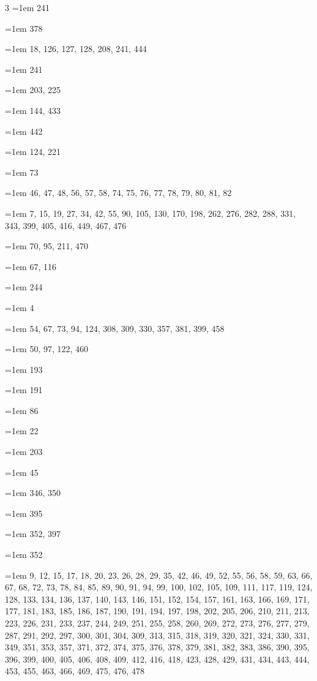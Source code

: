 \begin{multicols}{3}
\hangindent=1em  241\par
\hangindent=1em  378\par
\hangindent=1em  18, 126, 127, 128, 208, 241, 444\par
\hangindent=1em  241\par
\hangindent=1em  203, 225\par
\hangindent=1em  144, 433\par
\hangindent=1em  442\par
\hangindent=1em  124, 221\par
\hangindent=1em  73\par
\hangindent=1em  46, 47, 48, 56, 57, 58, 74, 75, 76, 77, 78, 79, 80, 81, 82\par
\hangindent=1em  7, 15, 19, 27, 34, 42, 55, 90, 105, 130, 170, 198, 262, 276, 282, 288, 331, 343, 399, 405, 416, 449, 467, 476\par
\hangindent=1em  70, 95, 211, 470\par
\hangindent=1em  67, 116\par
\hangindent=1em  244\par
\hangindent=1em  4\par
\hangindent=1em  54, 67, 73, 94, 124, 308, 309, 330, 357, 381, 399, 458\par
\hangindent=1em  50, 97, 122, 460\par
\hangindent=1em  193\par
\hangindent=1em  191\par
\hangindent=1em  86\par
\hangindent=1em  22\par
\hangindent=1em  203\par
\hangindent=1em  45\par
\hangindent=1em  346, 350\par
\hangindent=1em  395\par
\hangindent=1em  352, 397\par
\hangindent=1em  352\par
\hangindent=1em  9, 12, 15, 17, 18, 20, 23, 26, 28, 29, 35, 42, 46, 49, 52, 55, 56, 58, 59, 63, 66, 67, 68, 72, 73, 78, 84, 85, 89, 90, 91, 94, 99, 100, 102, 105, 109, 111, 117, 119, 124, 128, 133, 134, 136, 137, 140, 143, 146, 151, 152, 154, 157, 161, 163, 166, 169, 171, 177, 181, 183, 185, 186, 187, 190, 191, 194, 197, 198, 202, 205, 206, 210, 211, 213, 223, 226, 231, 233, 237, 244, 249, 251, 255, 258, 260, 269, 272, 273, 276, 277, 279, 287, 291, 292, 297, 300, 301, 304, 309, 313, 315, 318, 319, 320, 321, 324, 330, 331, 349, 351, 353, 357, 371, 372, 374, 375, 376, 378, 379, 381, 382, 383, 386, 390, 395, 396, 399, 400, 405, 406, 408, 409, 412, 416, 418, 423, 428, 429, 431, 434, 443, 444, 453, 455, 463, 466, 469, 475, 476, 478\par

\end{multicols}
